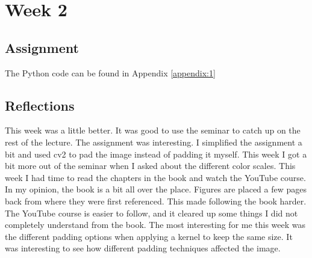 \documentclass{article}
\begin{document}
    \section{Week 2}
    \subsection{Assignment}
    The Python code can be found in Appendix \ref{appendix:1}
    \subsection{Reflections}
    This week was a little better. 
    It was good to use the seminar to catch up on the rest of the lecture. 
    The assignment was interesting. 
    I simplified the assignment a bit and used cv2 to pad the image instead of padding it myself. 
    This week I got a bit more out of the seminar when I asked about the different color scales. 
    This week I had time to read the chapters in the book and watch the YouTube course. 
    In my opinion, the book is a bit all over the place. 
    Figures are placed a few pages back from where they were first referenced. 
    This made following the book harder. 
    The YouTube course is easier to follow, 
    and it cleared up some things I did not completely understand from the book.
    The most interesting for me this week was the different padding options when applying a kernel to keep the same size.  
    It was interesting to see how different padding techniques affected the image.
\end{document}
